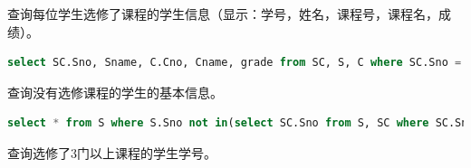 \documentclass[12pt, a4paper]{report}
\begin{document}
查询每位学生选修了课程的学生信息（显示：学号，姓名，课程号，课程名，成绩）。\\

\begin{lstlisting}[language=SQL]
    select SC.Sno, Sname, C.Cno, Cname, grade from SC, S, C where SC.Sno = S.Sno and SC.cno = C.cno;
\end{lstlisting}

\begin{figure}[H] %
    \centering %
\end{figure}

查询没有选修课程的学生的基本信息。\\

\begin{lstlisting}[language=SQL]
    select * from S where S.Sno not in(select SC.Sno from S, SC where SC.Sno = S.Sno);
\end{lstlisting}

\begin{figure}[H] %
    \centering %
\end{figure}

查询选修了3门以上课程的学生学号。\\
\end{document}
